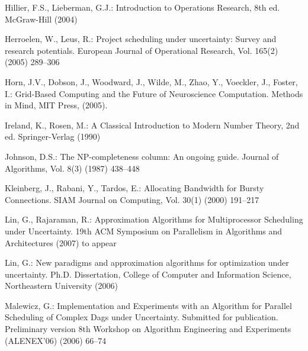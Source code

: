 \documentclass[letterpaper,11pt]{article}
\newcommand{\remove}[1]{}
\begin{document}
\begin{thebibliography}{99}
Hillier, F.S., Lieberman, G.J.:
Introduction to Operations Research, 8th ed.
McGraw-Hill (2004)

Herroelen, W., Leus, R.:
Project scheduling under uncertainty: Survey and research potentials.
European Journal of Operational Research, Vol. 165(2) (2005) 289--306

\remove{
\bibitem{HongK81}
Hong, J.-W., Kung, H.T.:
I/O complexity: the red-blue pebble game.  
13th ACM Symposium on Theory of Computing (STOC) (1981) 326--333
}

\remove{
\bibitem{HopcroftPV77}
Hopcroft, J.E., Paul, W., Valiant, L.G.:
On time versus space.
Journal of the ACM, Vol.~24 (1977) 332--337
}

Horn, J.V., Dobson, J., Woodward, J., Wilde, M., Zhao, Y., Voeckler, J., Foster, I.:
Grid-Based Computing and the Future of Neuroscience Computation.  Methods in Mind, MIT Press, (2005). 

Ireland, K., Rosen, M.:
A Classical Introduction to Modern Number Theory, 2nd ed.
Springer-Verlag (1990)

Johnson, D.S.:
The NP-completeness column: An ongoing guide.
Journal of Algorithms, Vol. 8(3) (1987) 438--448


\remove{
\bibitem{KY96}
Kouvelis, P., Yu, G.:
Robust Discrete Optimization and its Applications.
Kluwer Academic Publishers (1996)
}

Kleinberg, J., Rabani, Y., Tardos, E.:
Allocating Bandwidth for Bursty Connections.
SIAM Journal on Computing, Vol. 30(1) (2000) 191--217

\remove{************
\bibitem{KnuVol3}
Knuth, D.E.:
The Art of Computer Programming, Volume 3, Second Edition.
Addison-Wesley (1998)
************}

Lin, G., Rajaraman, R.:
Approximation Algorithms for Multiprocessor Scheduling under Uncertainty.
19th ACM Symposium on Parallelism in Algorithms and Architectures (2007) to appear

Lin, G.:
New paradigms and approximation algorithms for optimization under uncertainty.
Ph.D. Dissertation, College of Computer and Information Science, Northeastern University (2006)

\remove{
\bibitem{MCG82}
McGinnis, L.F.:
Project Scheduling with Resource Considerations.
Proceedings of the Annual Industrial Engineering Conference (1982) 463--466
}

Malewicz, G.:
Implementation and Experiments with an Algorithm for Parallel Scheduling of Complex Dags under Uncertainty. Submitted for publication. Preliminary version 8th Workshop on Algorithm Engineering and Experiments (ALENEX'06) (2006) 66--74


\end{thebibliography}
\end{document}
